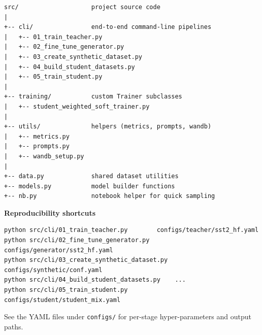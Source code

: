 \documentclass[11pt]{article}
\begin{document}
\begin{verbatim}
src/                    project source code
|
+-- cli/                end-to-end command-line pipelines
|   +-- 01_train_teacher.py
|   +-- 02_fine_tune_generator.py
|   +-- 03_create_synthetic_dataset.py
|   +-- 04_build_student_datasets.py
|   +-- 05_train_student.py
|
+-- training/           custom Trainer subclasses
|   +-- student_weighted_soft_trainer.py
|
+-- utils/              helpers (metrics, prompts, wandb)
|   +-- metrics.py
|   +-- prompts.py
|   +-- wandb_setup.py
|
+-- data.py             shared dataset utilities
+-- models.py           model builder functions
+-- nb.py               notebook helper for quick sampling
\end{verbatim}

\noindent\textbf{Reproducibility shortcuts}
\begin{verbatim}
python src/cli/01_train_teacher.py        configs/teacher/sst2_hf.yaml
python src/cli/02_fine_tune_generator.py  configs/generator/sst2_hf.yaml
python src/cli/03_create_synthetic_dataset.py  configs/synthetic/conf.yaml
python src/cli/04_build_student_datasets.py    ...
python src/cli/05_train_student.py        configs/student/student_mix.yaml
\end{verbatim}

\noindent
See the YAML files under \texttt{configs/} for per-stage
hyper-parameters and output paths.
\end{document}
